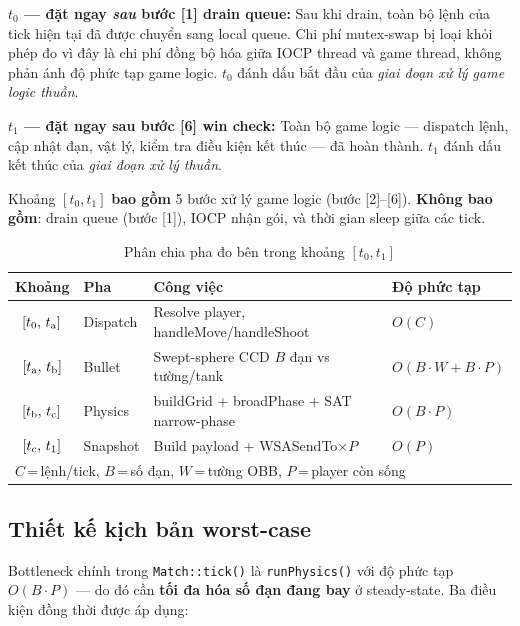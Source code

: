 \documentclass[12pt,a4paper]{report}
\begin{document}
\noindent\textbf{$t_0$ --- đặt ngay \emph{sau} bước [1] drain queue:}
Sau khi drain, toàn bộ lệnh của tick hiện tại đã được chuyển sang local queue.
Chi phí mutex-swap bị loại khỏi phép đo vì đây là chi phí đồng bộ hóa giữa
IOCP thread và game thread, không phản ánh độ phức tạp game logic.
$t_0$ đánh dấu bắt đầu của \emph{giai đoạn xử lý game logic thuần}.

\noindent\textbf{$t_1$ --- đặt ngay sau bước [6] win check:}
Toàn bộ game logic --- dispatch lệnh, cập nhật đạn, vật lý, kiểm tra điều kiện kết thúc ---
đã hoàn thành. $t_1$ đánh dấu kết thúc của \emph{giai đoạn xử lý thuần}.

\noindent Khoảng $[t_0, t_1]$ \textbf{bao gồm} 5 bước xử lý game logic (bước [2]--[6]).
\textbf{Không bao gồm}: drain queue (bước [1]), IOCP nhận gói, và thời gian sleep giữa các tick.

\begin{table}[H]
\centering
\caption{Phân chia pha đo bên trong khoảng $[t_0, t_1]$}
\label{tab:measurement_phases}
\begin{tabular}{clll}
\toprule
\textbf{Khoảng} & \textbf{Pha} & \textbf{Công việc} & \textbf{Độ phức tạp} \\
\midrule
$[t_0,\,t_{\rm a}]$        & Dispatch  & Resolve player, handleMove/handleShoot     & $O(C)$ \\
$[t_{\rm a},\,t_{\rm b}]$  & Bullet    & Swept-sphere CCD $B$ đạn vs tường/tank    & $O(B{\cdot}W\!+\!B{\cdot}P)$ \\
$[t_{\rm b},\,t_{\rm c}]$  & Physics   & buildGrid + broadPhase + SAT narrow-phase & $O(B{\cdot}P)$ \\
$[t_{\rm c},\,t_1]$        & Snapshot  & Build payload + WSASendTo$\times P$       & $O(P)$ \\
\bottomrule
\multicolumn{4}{l}{\footnotesize $C$\,=\,lệnh/tick,\; $B$\,=\,số đạn,\; $W$\,=\,tường OBB,\; $P$\,=\,player còn sống}
\end{tabular}
\end{table}

\subsection{Thiết kế kịch bản worst-case}

Bottleneck chính trong \texttt{Match::tick()} là \texttt{runPhysics()} với
độ phức tạp $O(B \cdot P)$ --- do đó cần \textbf{tối đa hóa số đạn đang bay}
ở steady-state. Ba điều kiện đồng thời được áp dụng:
\end{document}
